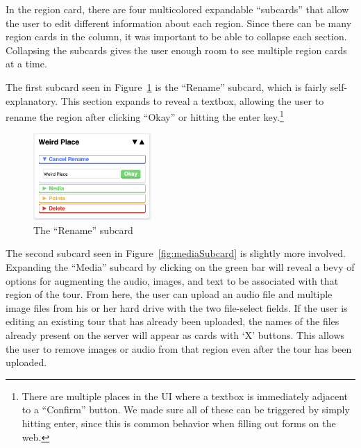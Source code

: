 \documentclass[a4paper, 10pt, american, titlepage]{article}
\begin{document}
In the region card, there are four multicolored expandable ``subcards'' that
allow the user to edit different information about each region. Since there can
be many region cards in the column, it was important to be able to collapse
each section. Collapsing the subcards gives the user enough room to see
multiple region cards at a time.

The first subcard seen in Figure~\ref{fig:renameSubcard} is the ``Rename''
subcard, which is fairly self-explanatory.  This section expands to reveal a
textbox, allowing the user to rename the region after clicking ``Okay'' or
hitting the enter key.\footnote{There are multiple places in the UI where a
textbox is immediately adjacent to a ``Confirm'' button.  We made sure all of
these can be triggered by simply hitting enter, since this is common behavior
when filling out forms on the web.}

\begin{figure}[h]
	\centering
	\includegraphics[width=0.4\textwidth]{rename-subcard-editour.png}
	\caption{The ``Rename'' subcard}
	\label{fig:renameSubcard}
\end{figure}

The second subcard seen in Figure~\ref{fig:mediaSubcard} is slightly more
involved. Expanding the ``Media'' subcard by clicking on the green bar will
reveal a bevy of options for augmenting the audio, images, and text to be
associated with that region of the tour. From here, the user can upload an
audio file and multiple image files from his or her hard drive with the two
file-select fields. If the user is editing an existing tour that has already
been uploaded, the names of the files already present on the server will appear
as cards with `X' buttons. This allows the user to remove images or audio from
that region even after the tour has been uploaded.
\end{document}
